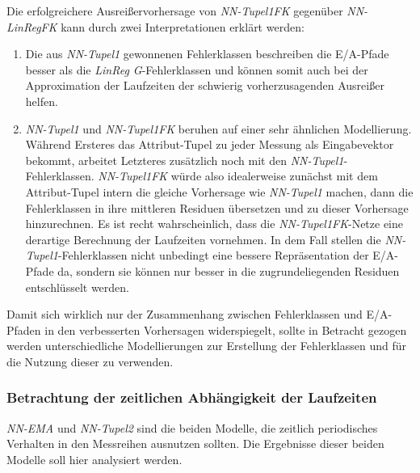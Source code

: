 \documentclass[
	12pt,
	a4paper,
	BCOR10mm,
	DIV14,
	listof=totoc,
	bibliography=totoc,
	headsepline
]{scrreprt}
\begin{document}
Die erfolgreichere Ausreißervorhersage von \textit{NN-Tupel1FK} gegenüber \textit{NN-LinRegFK} kann durch zwei Interpretationen erklärt werden:
\begin{enumerate}
	\item Die aus \textit{NN-Tupel1} gewonnenen Fehlerklassen beschreiben die E/A-Pfade besser als die \textit{LinReg G}-Fehlerklassen und können somit auch bei der Approximation der Laufzeiten der schwierig vorherzusagenden Ausreißer helfen.
	\item \textit{NN-Tupel1} und \textit{NN-Tupel1FK} beruhen auf einer sehr ähnlichen Modellierung.
	Während Ersteres das Attribut-Tupel zu jeder Messung als Eingabevektor bekommt, arbeitet Letzteres zusätzlich noch mit den \textit{NN-Tupel1}-Fehlerklassen.
	\textit{NN-Tupel1FK} würde also idealerweise zunächst mit dem Attribut-Tupel intern die gleiche Vorhersage wie \textit{NN-Tupel1} machen, dann die Fehlerklassen in ihre mittleren Residuen übersetzen und zu dieser Vorhersage hinzurechnen.
	Es ist recht wahrscheinlich, dass die \textit{NN-Tupel1FK}-Netze eine derartige Berechnung der Laufzeiten vornehmen.
	In dem Fall stellen die \textit{NN-Tupel1}-Fehlerklassen nicht unbedingt eine bessere Repräsentation der E/A-Pfade da, sondern sie können nur besser in die zugrundeliegenden Residuen entschlüsselt werden.
\end{enumerate}
Damit sich wirklich nur der Zusammenhang zwischen Fehlerklassen und E/A-Pfaden in den verbesserten Vorhersagen widerspiegelt, sollte in Betracht gezogen werden unterschiedliche Modellierungen zur Erstellung der Fehlerklassen und für die Nutzung dieser zu verwenden.

\subsubsection{Betrachtung der zeitlichen Abhängigkeit der Laufzeiten}
\textit{NN-EMA} und \textit{NN-Tupel2} sind die beiden Modelle, die zeitlich periodisches Verhalten in den Messreihen ausnutzen sollten.
Die Ergebnisse dieser beiden Modelle soll hier analysiert werden.\medskip
\end{document}
